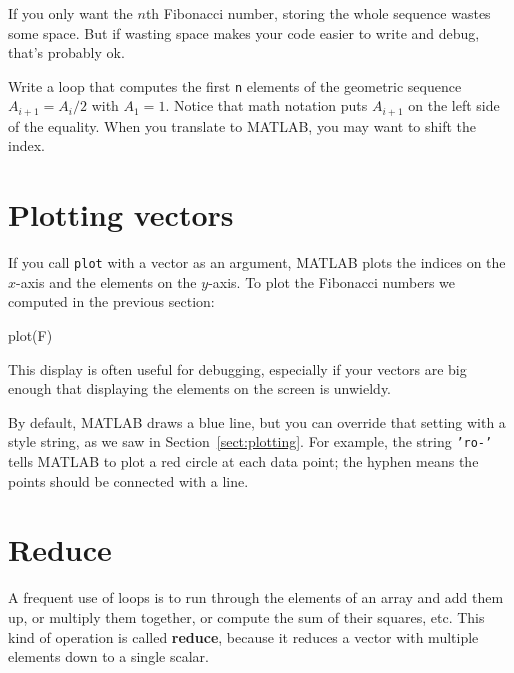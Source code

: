 \documentclass[
]{book}
\numberwithin{Answer}{chapter}
\numberwithin{Exercise}{chapter}
\begin{document}
If you only want the $n$th Fibonacci number, storing
the whole sequence wastes some space.  But if wasting space
makes your code easier to write and debug, that's probably ok.

\begin{ex}
Write a loop that computes the first {\tt n} elements
of the geometric sequence $A_{i+1} = A_i/2$ with $A_1 = 1$.  Notice that
math notation puts $A_{i+1}$ on the left side of the equality.
When you translate to MATLAB, you may want to shift the index.
\end{ex}


\section{Plotting vectors}


If you call {\tt plot} with a vector as an argument,
MATLAB plots the indices on the $x$-axis and the elements on the
$y$-axis.
To plot the Fibonacci numbers we computed in the previous section:

\begin{code}
plot(F)
\end{code}

This display is often useful for debugging, especially
if your vectors are big enough that displaying the elements on
the screen is unwieldy.


By default, MATLAB draws a blue line, but you can override that
setting with a style string, as we saw in Section~\ref{sect:plotting}.
For example, the string {\tt 'ro-'} tells MATLAB to plot a red circle
at each data point; the hyphen means the points should be connected
with a line.



\section{Reduce}
\label{sect:reduce}

A frequent use of loops is to run through the elements of an array
and add them up, or multiply them together, or compute the sum
of their squares, etc.  This kind of operation is called {\bf reduce},
because it reduces a vector with multiple elements down to a single
scalar.

\end{document}
